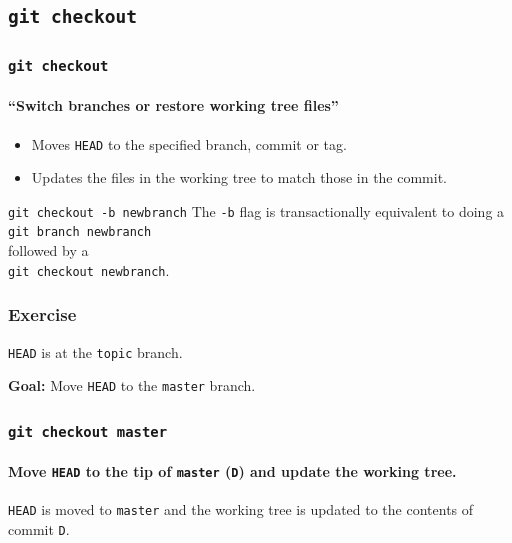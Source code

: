 \documentclass{beamer}
\newcommand\gitcmd[1]{\texttt{git #1}}
\newcommand\gflag[1]{\texttt{#1}}
\newcommand\grefspec[1]{\texttt{#1}}
\newcommand\gbranch[1]{\texttt{#1}}
\newcommand\gHEAD{\texttt{HEAD}}
\newcommand\goal[1]{\textbf{Goal:} #1}
\begin{document}
\subsection{\gitcmd{checkout}}

\begin{frame}
  \frametitle{\gitcmd{checkout}}
  \framesubtitle{``Switch branches or restore working tree files''}
  \begin{itemize}
    \item Moves \gHEAD{} to the specified branch, commit or tag.
    \item Updates the files in the working tree to match those in the commit.
  \end{itemize}
  \vfill
  \begin{block}{\gitcmd{checkout -b newbranch}}
    The \gflag{-b} flag is transactionally equivalent to doing a\\
    \hspace{2em}\gitcmd{branch newbranch}\\
    followed by a\\
    \hspace{2em}\gitcmd{checkout newbranch}.
  \end{block}
\end{frame}

\begin{frame}
  \frametitle{Exercise}
  \gHEAD{} is at the \gbranch{topic} branch.

  \goal{Move \gHEAD{} to the \gbranch{master} branch.}

  \begin{figure}
    \centering
  \end{figure}
\end{frame}

\begin{frame}
  \frametitle{\gitcmd{checkout master}}
  \framesubtitle{Move \gHEAD{} to the tip of \gbranch{master} (\grefspec{D}) and update the working tree.}
  \begin{figure}
    \centering
  \end{figure}

  \gHEAD{} is moved to \gbranch{master} and the working tree is updated to the contents of commit \grefspec{D}.
\end{frame}
\end{document}
